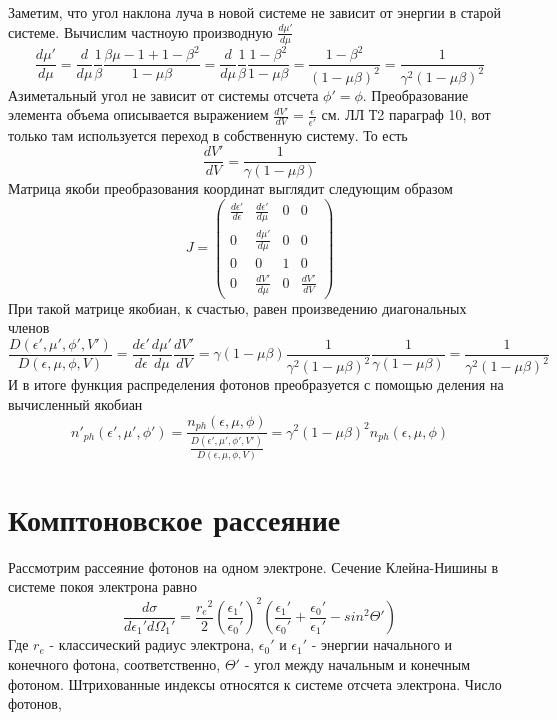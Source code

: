 \documentclass[a4paper,12pt]{jpconf}
\begin{document}
	Заметим, что угол наклона луча в новой системе не зависит от энергии в старой системе. Вычислим частноую производную $\frac{d\mu'}{d\mu}$
	\begin{equation}
		\frac{d\mu'}{d\mu}=\frac{d}{d\mu}\frac{1}{\beta}\frac{\beta\mu-1+1-\beta^2}{1-\mu\beta}=\frac{d}{d\mu}\frac{1}{\beta}\frac{1-\beta^2}{1-\mu\beta}=\frac{1-\beta^2}{(1-\mu\beta)^2}=\frac{1}{\gamma^2(1-\mu\beta)^2}
	\end{equation}
	Азиметальный угол не зависит от системы отсчета $\phi' = \phi$. Преобразование элемента объема описывается выражением $\frac{dV'}{dV} = \frac{\epsilon}{\epsilon'}$ см. ЛЛ Т2 параграф 10, вот только там используется переход в собственную систему. То есть
	\begin{equation}
		\frac{dV'}{dV} = \frac{1}{\gamma(1-\mu\beta)}
	\end{equation}
	Матрица якоби преобразования координат выглядит следующим образом
	\begin{equation}
		J=\left(
		\begin{array}{cccc}
			\frac{d\epsilon'}{d\epsilon} & \frac{d\epsilon'}{d\mu}& 0 & 0\\
			0 & \frac{d\mu'}{d\mu} & 0 & 0\\
			0 & 0 & 1 & 0\\
			0 & \frac{dV'}{d\mu} & 0 & \frac{dV'}{dV}
		\end{array}
		\right)
	\end{equation}
	При такой матрице якобиан, к счастью, равен произведению диагональных членов
	\begin{equation}\label{jacobian_ph}
		\frac{D(\epsilon',\mu',\phi',V')}{D(\epsilon,\mu,\phi,V)}=\frac{d\epsilon'}{d\epsilon}\frac{d\mu'}{d\mu}\frac{dV'}{dV}=\gamma(1-\mu\beta)\frac{1}{\gamma^2(1-\mu\beta)^2}\frac{1}{\gamma(1-\mu\beta)}=\frac{1}{\gamma^2(1-\mu\beta)^2}
	\end{equation}
	И в итоге функция распределения фотонов преобразуется с помощью деления на вычисленный якобиан
	\begin{equation}\label{distribution_ph}
		n'_{ph}(\epsilon',\mu',\phi') = \frac{n_{ph}(\epsilon,\mu,\phi)}{\frac{D(\epsilon',\mu',\phi',V')}{D(\epsilon,\mu,\phi,V)}}=\gamma^2(1-\mu\beta)^2 n_{ph}(\epsilon,\mu,\phi)
	\end{equation}
\section{Комптоновское рассеяние}
Рассмотрим рассеяние фотонов на одном электроне. Сечение Клейна-Нишины в системе покоя электрона равно
\begin{equation}
	\frac{d\sigma}{d\epsilon_1'd\Omega_1'}=\frac{{r_e}^2}{2}\left(\frac{\epsilon_1'}{\epsilon_0'}\right)^2\left(\frac{\epsilon_1'}{\epsilon_0'}+\frac{\epsilon_0'}{\epsilon_1'}-sin^2\Theta'\right)
\end{equation}
Где $r_e$ - классический радиус электрона, $\epsilon_0'$ и $\epsilon_1'$ - энергии начального и конечного фотона, соответственно, $\Theta'$ - угол между начальным и конечным фотоном. Штрихованные индексы относятся к системе отсчета электрона.
Число фотонов, 
\end{document}
